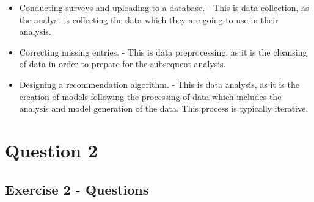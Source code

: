\documentclass{scrreprt}
\begin{document}
\begin{itemize}
\item Conducting surveys and uploading to a database. - This is data collection, as the analyst is collecting the data which they are going to use in their analysis.
\item Correcting missing entries. - This is data preprocessing, as it is the cleansing of data in order to prepare for the subsequent analysis.
\item Designing a recommendation algorithm. - This is data analysis, as it is the creation of models following the processing of data which includes the analysis and model generation of the data. This process is typically iterative.
\end{itemize}



\newpage
\chapter{Question 2}
\section{Exercise 2 - Questions}\label{E2Q}
\end{document}
